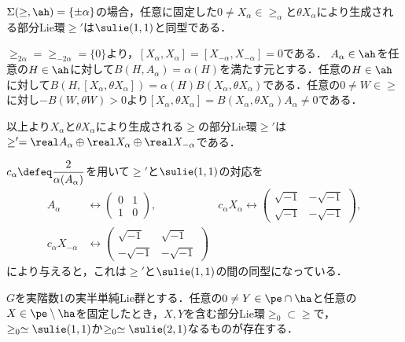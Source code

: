 \begin{lem}\label{lem:su11}
  
  $\Sigma(\ge,\ah) = \{\pm\alpha\}$の場合，任意に固定した$0\neq X_{\alpha}\in \ge_{\alpha}$と$\theta X_{\alpha}$により生成される部分Lie環$\ge'$は$\sulie(1,1)$と同型である．
\end{lem}

\begin{npfwn}
  $\ge_{2\alpha} = \ge_{-2\alpha} = \{0\}  $より，$[X_{\alpha}, X_{\alpha}] = [X_{-\alpha}, X_{-\alpha}] = 0 $である． $A_{\alpha}\in \ah $を任意の$H\in \ah$に対して$B(H,A_{\alpha}) = \alpha(H) $を満たす元とする．任意の$H\in \ah$に対して$B(H, [X_{\alpha}, \theta X_{\alpha}]) = \alpha(H) B(X_{\alpha}, \theta X_{\alpha}) $である．任意の$0\neq W\in \ge$に対し$-B(W,\theta W) > 0 $より$[X_{\alpha}, \theta X_{\alpha}] = B(X_{\alpha}, \theta X_{\alpha})A_{\alpha}\neq 0 $である．

  以上より$X_{\alpha} $と$\theta X_{\alpha} $により生成される$\ge$の部分Lie環$\ge'$は$\ge' = \real A_{\alpha}\oplus \real X_{\alpha} \oplus \real X_{-\alpha}  $である．

  $c_{\alpha}\defeq \dfrac{2}{\alpha(A_{\alpha})} $を用いて$\ge'$と$\sulie(1,1)$の対応を
  \begin{align*}
    A_{\alpha} &\leftrightarrow
    \begin{pmatrix}
      0 & 1 \\ 1 & 0
    \end{pmatrix},&  c_{\alpha} X_{\alpha} \leftrightarrow
      \begin{pmatrix}
        \sqrt{-1} & -\sqrt{-1} \\ \sqrt{-1} & -\sqrt{-1}
      \end{pmatrix},\\
    c_{\alpha}X_{-\alpha} &\leftrightarrow
      \begin{pmatrix}
        \sqrt{-1} & \sqrt{-1} \\ -\sqrt{-1} & -\sqrt{-1}
      \end{pmatrix} 
  \end{align*}
  により与えると，これは$\ge'$と$\sulie(1,1)$の間の同型になっている．
\end{npfwn}

\begin{cor}\label{cor:sub-lie-alg}
  $G$を実階数1の実半単純Lie群とする．任意の$0\neq Y\in \pe\cap\ha$と任意の$X\in \pe\setminus \ha$を固定したとき，$X,Y$を含む部分Lie環$\ge_0\subset \ge$で，$\ge_0\simeq \sulie(1,1) $か$\ge_0\simeq \sulie(2,1)$なるものが存在する．
\end{cor}

